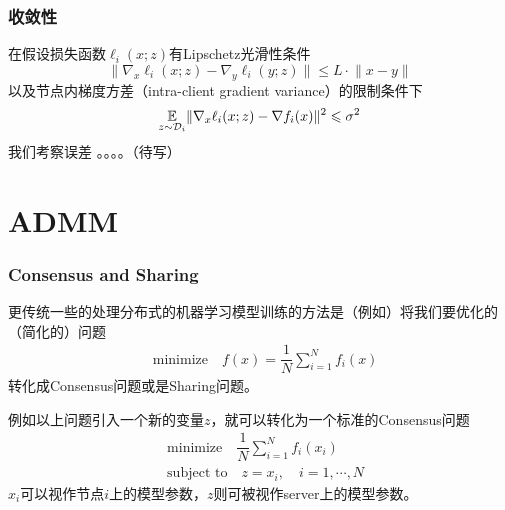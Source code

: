 
\begin{frame}
\frametitle{收敛性}

在假设损失函数$\ell_i(x;z)$有Lipschetz光滑性条件
$$\lVert \nabla_x \ell_i(x;z) - \nabla_y \ell_i(y;z) \rVert \leqslant L \cdot \lVert x-y \rVert$$
以及节点内梯度方差（intra-client gradient variance）的限制条件下
$$\operatorname*{\mathbb{E}}_{z \sim \mathcal{D}_i} \lVert \nabla_x \ell_i(x;z) - \nabla f_i(x) \rVert^2 \leqslant \sigma^2$$
我们考察误差 。。。。（待写）

\end{frame}


\section{ADMM}  %


\begin{frame}
\frametitle{Consensus and Sharing}

更传统一些的处理分布式的机器学习模型训练的方法是（例如\cite{boyd2011distributed}）将我们要优化的（简化的）问题
\begin{align*}
    & \text{minimize} \quad f(x) = \dfrac{1}{N} \sum\limits_{i=1}^N f_i(x)
\end{align*}
转化成Consensus问题或是Sharing问题。

\pause
\vspace{0.8em}

例如以上问题引入一个新的变量$z$，就可以转化为一个标准的Consensus问题
\begin{align*}
    & \text{minimize} \quad \dfrac{1}{N} \sum\limits_{i=1}^N f_i(x_i) \\
    & \text{subject to} \quad z = x_i, \quad i=1,\cdots,N
\end{align*}
$x_i$可以视作节点$i$上的模型参数，$z$则可被视作server上的模型参数。

\end{frame}


